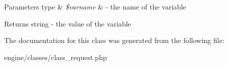 \begin{DoxyParams}[1]{Parameters}
type & {\em \$varname} & -\/ the name of the variable \\
\hline
\end{DoxyParams}
\begin{DoxyReturn}{Returns}
string -\/ the value of the variable 
\end{DoxyReturn}


The documentation for this class was generated from the following file\-:\begin{DoxyCompactItemize}
\item 
engine/classes/class\-\_\-request.\-php\end{DoxyCompactItemize}
